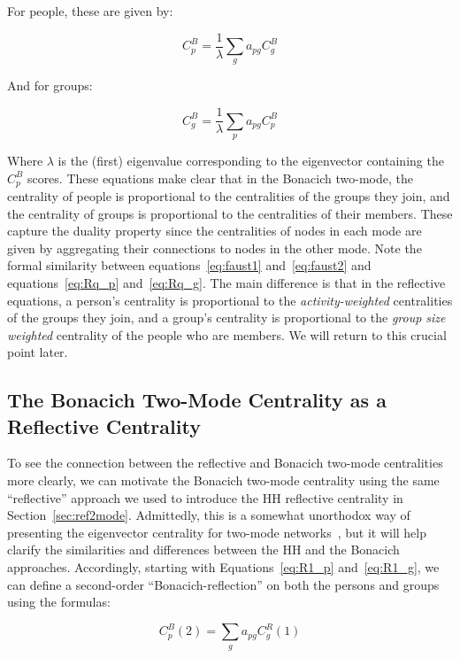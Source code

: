 \documentclass[a4paper,fleqn]{cas-sc}
\begin{document}
For people, these are given by: 

\begin{equation}
    C^B_p = \frac{1}{\lambda}\sum_{g}a_{pg}C^B_g
    \label{eq:faust1}
\end{equation}

And for groups:

\begin{equation}
    C^B_g = \frac{1}{\lambda}\sum_{p}a_{pg}C^B_p
    \label{eq:faust2}
\end{equation}

Where $\lambda$ is the (first) eigenvalue corresponding to the eigenvector containing the $C^B_p$ scores. These equations make clear that in the Bonacich two-mode, the centrality of people is proportional to the centralities of the groups they join, and the centrality of groups is proportional to the centralities of their members. These capture the duality property since the centralities of nodes in each mode are given by aggregating their connections to nodes in the other mode. Note the formal similarity between equations~\ref{eq:faust1} and~\ref{eq:faust2} and equations~\ref{eq:Rq_p} and~\ref{eq:Rq_g}. The main difference is that in the reflective equations, a person's centrality is proportional to the \textit{activity-weighted} centralities of the groups they join, and a group's centrality is proportional to the \textit{group size weighted} centrality of the people who are members. We will return to this crucial point later.

\subsection{The Bonacich Two-Mode Centrality as a Reflective Centrality} \label{subsec:bonref}
To see the connection between the reflective and Bonacich two-mode centralities more clearly, we can motivate the Bonacich two-mode centrality using the same ``reflective'' approach we used to introduce the HH reflective centrality in Section~\ref{sec:ref2mode}. Admittedly, this is a somewhat unorthodox way of presenting the eigenvector centrality for two-mode networks~\citep{bonacich1991simultaneous}, but it will help clarify the similarities and differences between the HH and the Bonacich approaches. Accordingly, starting with Equations~\ref{eq:R1_p} and~\ref{eq:R1_g}, we can define a second-order ``Bonacich-reflection'' on both the persons and groups using the formulas:

\begin{equation}
   C^B_p(2) = \sum_g a_{pg}C^R_g(1)
   \label{eq:BR2_p}
\end{equation} 
\end{document}
